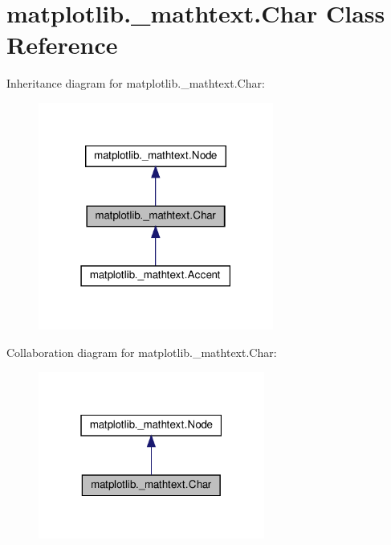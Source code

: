 \hypertarget{classmatplotlib_1_1__mathtext_1_1Char}{}\section{matplotlib.\+\_\+mathtext.\+Char Class Reference}
\label{classmatplotlib_1_1__mathtext_1_1Char}


Inheritance diagram for matplotlib.\+\_\+mathtext.\+Char\+:
\nopagebreak
\begin{figure}[H]
\begin{center}
\leavevmode
\includegraphics[width=219pt]{classmatplotlib_1_1__mathtext_1_1Char__inherit__graph}
\end{center}
\end{figure}


Collaboration diagram for matplotlib.\+\_\+mathtext.\+Char\+:
\nopagebreak
\begin{figure}[H]
\begin{center}
\leavevmode
\includegraphics[width=211pt]{classmatplotlib_1_1__mathtext_1_1Char__coll__graph}
\end{center}
\end{figure}
